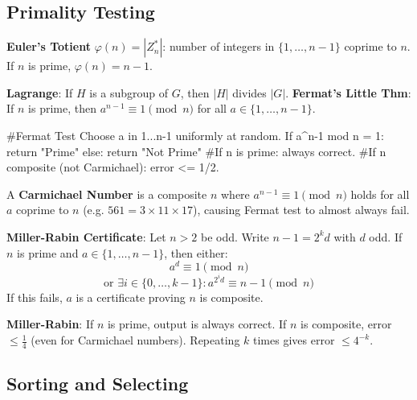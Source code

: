 \subsection{Primality Testing}

\begin{definition}
	\textbf{Euler's Totient} $\varphi(n) = |Z_n^*|$: number of integers in $\{1,\dots,n-1\}$ coprime to $n$. If $n$ is prime, $\varphi(n)=n-1$.
\end{definition}

\begin{theorem}
	\textbf{Lagrange}: If $H$ is a subgroup of $G$, then $|H|$ divides $|G|$.
	\textbf{Fermat's Little Thm}: If $n$ is prime, then $a^{n-1} \equiv 1 \pmod n$ for all $a \in \{1,\dots,n-1\}$.
\end{theorem}

\begin{algorithm}
	#Fermat Test
	Choose a in {1...n-1} uniformly at random.
	If a^{n-1} mod n = 1: return "Prime"
	else: return "Not Prime"
	#If n is prime: always correct.
	#If n composite (not Carmichael): error <= 1/2.
\end{algorithm}

\begin{definition}
	A \textbf{Carmichael Number} is a composite $n$ where $a^{n-1} \equiv 1 \pmod n$ holds for all $a$ coprime to $n$ (e.g. $561 = 3 \times 11 \times 17$), causing Fermat test to almost always fail.
\end{definition}

\begin{definition}
	\textbf{Miller-Rabin Certificate}: Let $n > 2$ be odd. Write $n-1 = 2^k d$ with $d$ odd. If $n$ is prime and $a \in \{1,\dots,n-1\}$, then either:
	$$a^d \equiv 1 \pmod n$$
	$$\text{or } \exists i \in \{0,\dots,k\!-\!1\}: a^{2^i d} \equiv n\!-\!1 \pmod n$$
	If this fails, $a$ is a certificate proving $n$ is composite.
\end{definition}

\begin{theorem}
	\textbf{Miller-Rabin}: If $n$ is prime, output is always correct. If $n$ is composite, error $\leq \frac{1}{4}$ (even for Carmichael numbers). Repeating $k$ times gives error $\leq 4^{-k}$.
\end{theorem}

\subsection{Sorting and Selecting}


